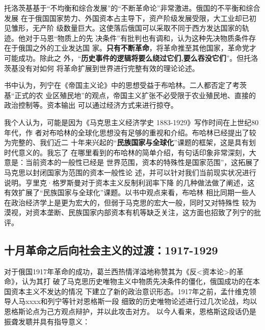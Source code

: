 托洛茨基基于“不均衡和综合发展”的“不断革命论”非常激进。俄国的不平衡和综合发展
在于俄国国家势力、外国资本占主导下，资产阶级发展受限，大工业却已初见雏形，无产阶
级数量巨大。这使落后俄国可以采取不同于西方发达国家的轨迹。他对于马恩“物质上的先
决条件”有批判也有调和，认为这种先决物质条件存在于俄国之外的工业发达国
家。\textbf{只有不断革命}，将革命推至其他国家，革命党才可能成功。除此之
外，“\textbf{历史事件的逻辑将要么绕过它们,要么吞没它们}”。但托洛茨基没有对如何
将革命扩展到世界进行完整有效的理论论述。

书中认为，列宁在《帝国主义论》中的思想受益于布哈林。二人都否定了考茨基“正式的农
业区殖民地”的观点，帝国主义扩张不必受限于农业殖民地、直接的政治控制等。资本输出
可以通过经济方式来进行掠夺。

我个人认为，可能是因为《马克思主义经济学史 1883-1929》写作时间在上世纪80年代，作
者对布哈林的全球化思想没有足够的重视和介绍。布哈林已经提出了较为完整的、我们近二
十年来兴起的“\textbf{民族国家与全球化}”课题的框架，这是具有划时代意义的。我忘了
在哪里看到的布哈林的简单介绍，有句话印象非常深刻，大意是：当前资本的一般性已经是
世界范围，资本的特殊性是国家范围”，这拓展了马克思以封闭国家为范围的资本一般性论
述，并可以针对我们当前现实状况进行说明。亨里克·格罗斯曼对于资本主义反制利润率下降
的几种做法做了阐述，这有效扩展了“民族国家与全球化”课题。以书中观点来看，布哈林
相比同期一些人在政治经济学上是更为宏大的，但弱于马克思的宏大一般，同时又对特殊性
较为漠视，对资本垄断、民族国家内部资本有机等缺乏关注，这方面也招致了列宁的批评。


\subsection{十月革命之后向社会主义的过渡：1917-1929}

对于俄国1917年革命的成功，葛兰西热情洋溢地称赞其为《反<资本论>的革命》，认为其打
破了马克思历史唯物主义中物质先决条件的僵化，俄国成功的在本国资本主义不发达的情况
下建立了新的政治意识形态。1917年之前，孟什维克领导人马xxxx和列宁等针对恩格斯一段
细致的历史唯物论述进行过几次论战，均以恩格斯论点为己方观点辩护，并以此攻击对方。
以今人看来，恩格斯这段话仍是振聋发聩并具有指导意义：

